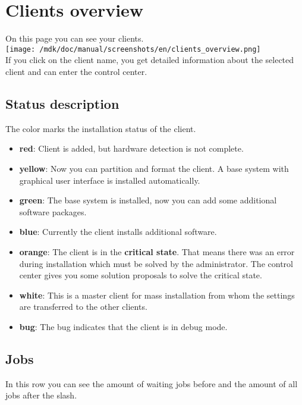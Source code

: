 \section{Clients overview}On this page you can see your clients.\\
\texttt{[image: /mdk/doc/manual/screenshots/en/clients\_overview.png]} \\
If you click on the client name, you get detailed information about the selected client and can enter the control center.\\
\subsection{Status description}
The color marks the installation status of the client.\\
\begin{itemize}
\item \textbf{red}: Client is added, but hardware detection is not complete.\\
\item \textbf{yellow}: Now you can partition and format the client. A base system with graphical user interface is installed automatically.\\
\item \textbf{green}: The base system is installed, now you can add some additional software packages.\\
\item \textbf{blue}: Currently the client installs additional software.\\
\item \textbf{orange}: The client is in the \textbf{critical state}. That means there was an error during installation which must be solved by the administrator. The control center gives you some solution proposals to solve the critical state.\\
\item \textbf{white}: This is a master client for mass installation from whom the settings are transferred to the other clients.\\
\item \textbf{bug}: The bug indicates that the client is in debug mode.\\
\end{itemize}
\subsection{Jobs}
In this row you can see the amount of waiting jobs before and the amount of all jobs after the slash.\\
